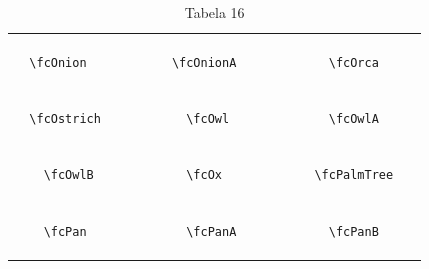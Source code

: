 \documentclass[x11names]{article}
\begin{document}
\begin{table}[H]
\begin{tabular}{|c|c|c|c|c|c|}
		&\multirow{5}{*}{	\fcOnion	[scale=0.16]} & &\multirow{5}{*}{	\fcOnionA	[scale=0.16]} & &\multirow{5}{*}{	\fcOrca	[scale=0.09]}\\	& & & & & \\	& & & & & \\	\verb|	\fcOnion	| & & \verb|	\fcOnionA	| & & \verb|	\fcOrca	| & \\	& & & & & \\	& & & & & \\	& & & & & \\	\hline									
		&\multirow{5}{*}{	\fcOstrich	[scale=0.16]} & &\multirow{5}{*}{	\fcOwl	[scale=0.16]} & &\multirow{5}{*}{	\fcOwlA	[scale=0.64]}\\	& & & & & \\	& & & & & \\	\verb|	\fcOstrich	| & & \verb|	\fcOwl	| & & \verb|	\fcOwlA	| & \\	& & & & & \\	& & & & & \\	& & & & & \\	\hline									
		&\multirow{5}{*}{	\fcOwlB	[scale=0.16]} & &\multirow{5}{*}{	\fcOx	[scale=0.16]} & &\multirow{5}{*}{	\fcPalmTree	[scale=0.09]}\\	& & & & & \\	& & & & & \\	\verb|	\fcOwlB	| & & \verb|	\fcOx	| & & \verb|	\fcPalmTree	| & \\	& & & & & \\	& & & & & \\	& & & & & \\	\hline									
		&\multirow{5}{*}{	\fcPan	[scale=0.16]} & &\multirow{5}{*}{	\fcPanA	[scale=0.16]} & &\multirow{5}{*}{	\fcPanB	[scale=0.16]}\\	& & & & & \\	& & & & & \\	\verb|	\fcPan	| & & \verb|	\fcPanA	| & & \verb|	\fcPanB	| & \\	& & & & & \\	& & & & & \\	& & & & & \\		\hline 	\hline 	\end{tabular}	\caption{	Tabela 16	}\label{	Tab16	}\end{table}
\end{document}
